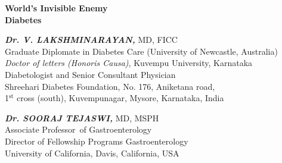 \thispagestyle{empty}

\begin{center}
\Huge\textbf{World’s Invisible Enemy\\ Diabetes}
\end{center}

\vskip 150pt


\begin{center}
{\large\textbf{\textit{Dr. V. LAKSHMINARAYAN,}} MD, FICC\\{\small Graduate Diplomate in Diabetes Care (University of Newcastle, Australia)\\\textit{Doctor of letters (Honoris Causa)}, Kuvempu University, Karnataka\\ Diabetologist and Senior Consultant Physician\\ Shreehari Diabetes Foundation, No. 176, Aniketana road,\\ 1$^{\text{st}}$ cross (south), Kuvempunagar, Mysore, Karnataka, India}}
\end{center}

\vskip 30pt

\begin{center}
{\large\textbf{\textit{Dr. SOORAJ TEJASWI,}} MD, MSPH\\{\small Associate Professor of Gastroenterology\\Director of Fellowship Programs Gastroenterology\\ University of California, Davis, California, USA}}
\end{center}
